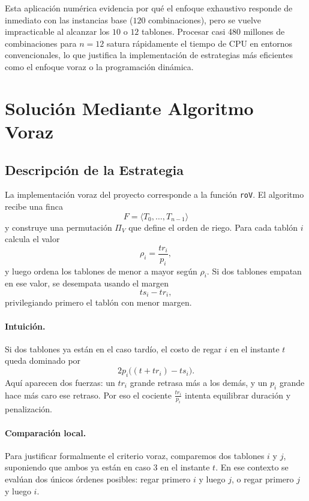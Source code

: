 \documentclass[12pt,a4paper]{article}
\begin{document}
Esta aplicaci\'on num\'erica evidencia por qu\'e el enfoque exhaustivo responde de inmediato con las instancias base ($120$ combinaciones), pero se vuelve impracticable al alcanzar los $10$ o $12$ tablones. Procesar casi 480 millones de combinaciones para $n=12$ satura r\'apidamente el tiempo de CPU en entornos convencionales, lo que justifica la implementaci\'on de estrategias m\'as eficientes como el enfoque voraz o la programaci\'on din\'amica.

\section{Soluci\'on Mediante Algoritmo Voraz}

\subsection{Descripci\'on de la Estrategia}

La implementaci\'on voraz del proyecto corresponde a la funci\'on \texttt{roV}. El algoritmo recibe una finca
\[
F=\langle T_0,\dots,T_{n-1}\rangle
\]
y construye una permutaci\'on \(\Pi_V\) que define el orden de riego. Para cada tabl\'on \(i\) calcula el valor
\[
\rho_i=\frac{tr_i}{p_i},
\]
y luego ordena los tablones de menor a mayor seg\'un \(\rho_i\). Si dos tablones empatan en ese valor, se desempata usando el margen
\[
ts_i - tr_i,
\]
privilegiando primero el tabl\'on con menor margen.

\paragraph{Intuici\'on.}
Si dos tablones ya est\'an en el caso tard\'io, el costo de regar \(i\) en el instante \(t\) queda dominado por
\[
2p_i\bigl((t+tr_i)-ts_i\bigr).
\]
Aqu\'i aparecen dos fuerzas: un \(tr_i\) grande retrasa m\'as a los dem\'as, y un \(p_i\) grande hace m\'as caro ese retraso. Por eso el cociente \(\frac{tr_i}{p_i}\) intenta equilibrar duraci\'on y penalizaci\'on.

\paragraph{Comparaci\'on local.}
Para justificar formalmente el criterio voraz, comparemos dos tablones \(i\) y \(j\), suponiendo que ambos ya est\'an en caso 3 en el instante \(t\). En ese contexto se eval\'uan dos \'unicos \'ordenes posibles: regar primero \(i\) y luego \(j\), o regar primero \(j\) y luego \(i\).
\end{document}
